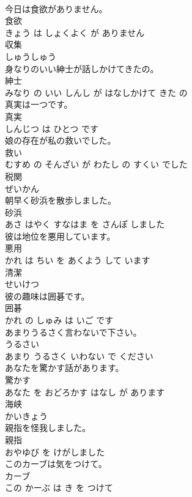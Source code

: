 \documentclass[8pt]{extreport}
\begin{document}
\begin{CJK}{UTF8}{min}
\\	今日は食欲がありません。	
\\	食欲 
\\	きょう は しょくよく が ありません			
\\	収集	
\\	しゅうしゅう			
\\	身なりのいい紳士が話しかけてきたの。	
\\	紳士 
\\	みなり の いい しんし が はなしかけて きた の			
\\	真実は一つです。	
\\	真実 
\\	しんじつ は ひとつ です			
\\	娘の存在が私の救いでした。	
\\	救い 
\\	むすめ の そんざい が わたし の すくい でした			
\\	税関	
\\	ぜいかん			
\\	朝早く砂浜を散歩しました。	
\\	砂浜 
\\	あさ はやく すなはま を さんぽ しました			
\\	彼は地位を悪用しています。	
\\	悪用 
\\	かれ は ちい を あくよう して います			
\\	清潔	
\\	せいけつ			
\\	彼の趣味は囲碁です。	
\\	囲碁 
\\	かれ の しゅみ は いご です			
\\	あまりうるさく言わないで下さい。	
\\	うるさい 
\\	あまり うるさく いわない で ください			
\\	あなたを驚かす話があります。	
\\	驚かす 
\\	あなた を おどろかす はなし が あります			
\\	海峡	
\\	かいきょう			
\\	親指を怪我しました。	
\\	親指 
\\	おやゆび を けがしました			
\\	このカーブは気をつけて。	
\\	カーブ 
\\	この かーぶ は き を つけて			

\end{CJK}
\end{document}
